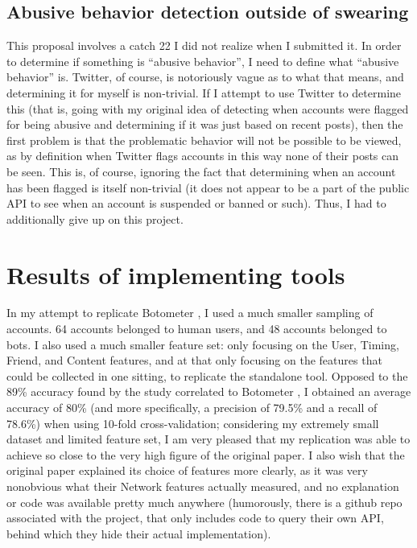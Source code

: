 \documentclass[11pt]{article}
\begin{document}
\subsection{Abusive behavior detection outside of swearing}
This proposal involves a catch 22 I did not realize when I submitted it. In order to determine if something is ``abusive behavior'', I need to define what ``abusive behavior'' is. Twitter, of course, is notoriously vague as to what that means, and determining it for myself is non-trivial. If I attempt to use Twitter to determine this (that is, going with my original idea of detecting when accounts were flagged for being abusive and determining if it was just based on recent posts), then the first problem is that the problematic behavior will not be possible to be viewed, as by definition when Twitter flags accounts in this way none of their posts can be seen. This is, of course, ignoring the fact that determining when an account has been flagged is itself non-trivial (it does not appear to be a part of the public API to see when an account is suspended or banned or such). Thus, I had to additionally give up on this project.

\section{Results of implementing tools}
\label{implementation-results}
In my attempt to replicate Botometer \cite{botometer-main}, I used a much smaller sampling of accounts. 64 accounts belonged to human users, and 48 accounts belonged to bots. I also used a much smaller feature set: only focusing on the User, Timing, Friend, and Content features, and at that only focusing on the features that could be collected in one sitting, to replicate the standalone tool. Opposed to the 89\% accuracy found by the study correlated to Botometer \cite{botometer-paper}, I obtained an average accuracy of 80\% (and more specifically, a precision of 79.5\% and a recall of 78.6\%) when using 10-fold cross-validation; considering my extremely small dataset and limited feature set, I am very pleased that my replication was able to achieve so close to the very high figure of the original paper. I also wish that the original paper explained its choice of features more clearly, as it was very nonobvious what their Network features actually measured, and no explanation or code was available pretty much anywhere (humorously, there is a github repo associated with the project, that only includes code to query their own API, behind which they hide their actual implementation).
\end{document}
